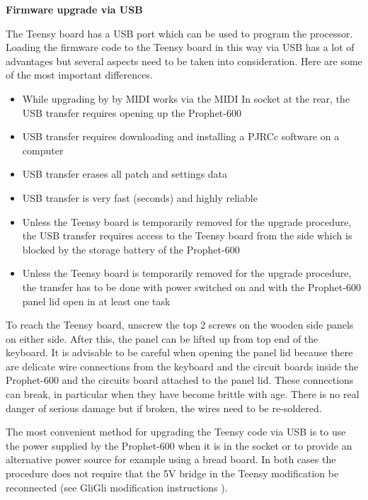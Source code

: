\textbf{Firmware upgrade via USB}

The Teensy board has a USB port which can be used to program the processor. Loading the firmware code to the Teensy board in this way via USB has a lot of advantages but several aspects need to be taken into consideration. Here are some of the most important differences.

\begin{itemize}
  \item While upgrading by by MIDI works via the MIDI In socket at the rear, the USB transfer requires opening up the Prophet-600
  \item USB transfer requires downloading and installing a PJRCc software on a computer
  \item USB transfer erases all patch and settings data
  \item USB transfer is very fast (seconds) and highly reliable
  \item Unless the Teensy board is temporarily removed for the upgrade procedure, the USB transfer requires access to the Teensy board from the side which is blocked by the storage battery of the Prophet-600
  \item Unless the Teensy board is temporarily removed for the upgrade procedure, the transfer has to be done with power switched on and with the Prophet-600 panel lid open in at least one task 
\end{itemize}

To reach the Teensy board, unscrew the top 2 screws on the wooden side panels on either side. After this, the panel can be lifted up from top end of the keyboard. It is advisable to be careful when opening the panel lid because there are delicate wire connections from the keyboard and the circuit boards inside the Prophet-600 and the circuits board attached to the panel lid. These connections can break, in particular when they have become brittle with age. There is no real danger of serious damage but if broken, the wires need to be re-soldered.


The most convenient method for upgrading the Teensy code via USB is to use the power supplied by the Prophet-600 when it is in the socket or to provide an alternative power source for example using a bread board. In both cases the procedure does not require that the 5V bridge in the Teensy modification be reconnected (see GliGli modification instructions \cite{modinstructions}).

